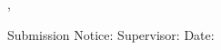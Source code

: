 \begin{titlepage}
{\begin{center}
\vfill\vfill\vfill\vfill


\vfill\vfill\vfill\vfill

\mysubmissiontown, \mysubmissionmonth~\mysubmissionyear

\vspace{0.5cm}
\hrulefill

\begin{flushleft}
	

\vfill\vfill
Submission Notice:    \hspace{5cm} 					Supervisor:
\vfill\vfill
Date:       
\end{flushleft}
\end{center}
}%
\end{titlepage}